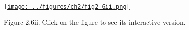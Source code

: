 \documentclass{article}
\begin{document}
\begin{figure}[h]
    \begin{center}
        \href{http://www.gatsby.ucl.ac.uk/~rapela/durbinAndKoopman12/figures/ch2/fig2_6ii.html}{\texttt{[image: ../figures/ch2/fig2\_6ii.png]}}
    \end{center}
    \caption{Figure 2.6ii. Click on the figure to see its interactive version.}
\end{figure}
\end{document}
